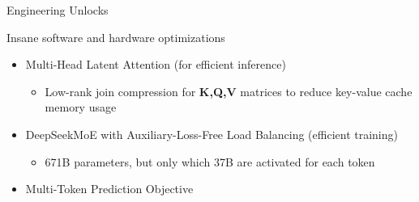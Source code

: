 \documentclass[8pt]{beamer}
\begin{document}
\begin{frame}{Engineering Unlocks}

Insane software and hardware optimizations

\begin{itemize} \setlength{\itemsep}{8pt}
    \item Multi-Head Latent Attention (for efficient inference)
        \begin{itemize}
            \item Low-rank join compression for \textbf{K,Q,V} matrices to reduce key-value cache memory usage
        \end{itemize}
    \item DeepSeekMoE with Auxiliary-Loss-Free Load Balancing (efficient training)
    \begin{itemize}
        \item 671B parameters, but only which 37B are activated for each token
    \end{itemize}

    \item Multi-Token Prediction Objective
    
\end{itemize}
    
\end{frame}
\end{document}
